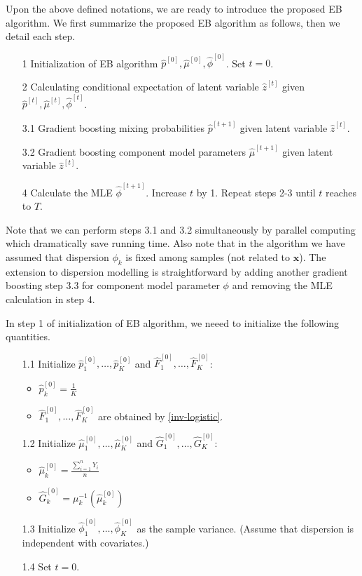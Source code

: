 \documentclass[11pt]{article}
\numberwithin{equation}{section}
\def\bx{\boldsymbol{x}}
\begin{document}
Upon the above defined notations, we are ready to introduce the proposed EB algorithm.
We first summarize the proposed EB algorithm as follows, then we detail each step.
\begin{enumerate}
	\item[1] Initialization of EB algorithm $\hat{p}^{[0]},\hat{\mu}^{[0]},\hat{\phi}^{[0]}$. Set $t=0$.
	
	\item[2] Calculating conditional expectation of latent variable $\hat{z}^{[t]}$ given $\hat{p}^{[t]},\hat{\mu}^{[t]},\hat{\phi}^{[t]}$.
	
	\item[3.1]  Gradient boosting mixing probabilities $\hat{p}^{[t+1]}$  given latent variable $\hat{z}^{[t]}$.
	\item[3.2] Gradient boosting component model parameters $\hat{\mu}^{[t+1]}$ given latent variable $\hat{z}^{[t]}$.
	\item[4]  Calculate the MLE $\hat{\phi}^{[t+1]}$. Increase $t$ by 1. Repeat steps 2-3 until $t$ reaches to $T$.
	
\end{enumerate}
Note that we can perform steps 3.1 and 3.2 simultaneously by parallel computing which dramatically save running time.  Also note that  in the algorithm we have assumed that dispersion $\phi_k$ is fixed among samples (not related to $\bx$). The extension to dispersion modelling is straightforward by adding another gradient boosting step 3.3 for component model parameter $\phi$ and removing the MLE calculation in step 4.
	
In step 1 of initialization of EB algorithm, we neeed to initialize the following quantities.
	\begin{enumerate}
		\item[1.1] Initialize $\hat{p}_1^{[0]}, \ldots,\hat{p}_K^{[0]}$ and   $\hat{F}_1^{[0]}, \ldots, \hat{F}_{K}^{[0]}$:
		
		\begin{itemize}
			\item 	$\hat{p}_k^{[0]}=\frac{1}{K}$
			\item $\hat{F}_1^{[0]}, \ldots, \hat{F}_{K}^{[0]}$ are obtained by \eqref{inv-logistic}.
		\end{itemize}
		\item[1.2]
		Initialize $\hat{\mu}_1^{[0]},\ldots,\hat{\mu}_K^{[0]}$ and  $\hat{G}_1^{[0]},\ldots,\hat{G}_K^{[0]}$:
		
		\begin{itemize}
			\item $\hat{\mu}_k^{[0]}=\frac{\sum_{i=1}^nY_i}{n}$
			\item $\hat{G}_k^{[0]}=\mu_k^{-1}(\hat{\mu}_k^{[0]})$
		\end{itemize}
		\item[1.3] Initialize $\hat{\phi}_1^{[0]},\ldots, \hat{\phi}_K^{[0]}$ as the sample variance. (Assume that dispersion is independent with covariates.)
		\item[1.4] 	Set $t=0$.
	\end{enumerate}
	
\end{document}

